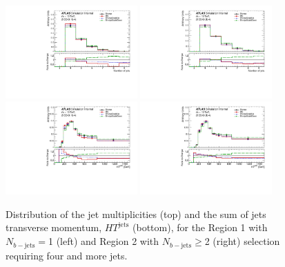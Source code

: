 \begin{figure}[!htb]
\centering
\includegraphics[width=0.45\textwidth]{Plots/ttV/shape/c_Region_0_nJets}
\includegraphics[width=0.45\textwidth]{Plots/ttV/shape/c_Region_1_nJets}\\
\includegraphics[width=0.45\textwidth]{Plots/ttV/shape/c_Region_0_HT_jets}
\includegraphics[width=0.45\textwidth]{Plots/ttV/shape/c_Region_1_HT_jets}\\
  \caption{Distribution of the jet multiplicities (top) and the sum of jets transverse momentum, $HT^{\text{jets}}$ (bottom), for the Region 1 with $N_{b-\mathrm{jets}}=$1 (left) and Region 2 with  $N_{b-\mathrm{jets}}\geq$2 (right) selection requiring four and more jets.  \label{ttV:4j12b}}
\end{figure}


